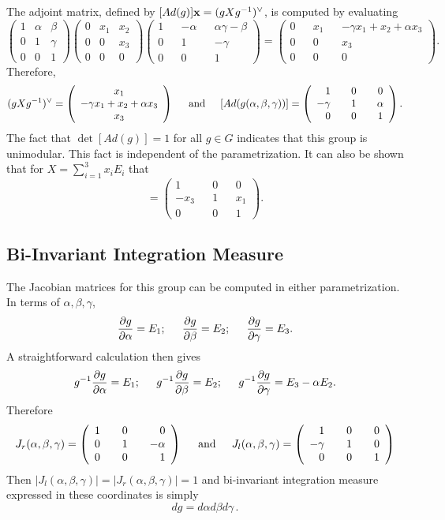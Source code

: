 \documentclass{svmult}
\def\htab{ {\hskip 0.1 true in} }
\newcommand{\ba}{\left(\begin{array}}
\newcommand{\ea}{\end{array}\right)}
\newcommand{\beq}{ \begin{equation}}
\newcommand{\eeq}{ \end{equation} }
\newcommand{\askip}{\htab\htab {\rm and} \htab\htab}
\begin{document}
The adjoint matrix, defined by $[Ad(g)] {\bf x} = (g X g^{-1})^{\vee}$,
is computed by evaluating
$$ \ba{ccc}
1 & \alpha & \beta \\
0 & 1 & \gamma \\
0 & 0 & 1
\ea \ba{ccc}
0 & x_1 & x_2 \\
0 & 0 & x_3 \\
0 & 0 & 0
\ea \ba{ccccc}
1 & & -\alpha & & \alpha \gamma -\beta \\
0 & & 1 & &  -\gamma \\
0 & & 0 & & 1
\ea = \ba{ccccc}
0 & & x_1 & & -\gamma x_1 + x_2 + \alpha x_3 \\
0 & & 0 & & x_3 \\
0 & & 0 & & 0
\ea . $$
Therefore,
$$ (g X g^{-1})^{\vee} = \ba{c}
x_1 \\
-\gamma x_1 + x_2 + \alpha x_3 \\
x_3 \ea \askip
[Ad(g(\alpha, \beta, \gamma))] =
\ba{rcccc}
1 & &   0 & &   0 \\
-\gamma & &   1 & &    \alpha\\
0 & &   0 & &   1
\ea .$$
The fact that $\det [Ad(g)] = 1$ for all $g \in G$ indicates that this
group is unimodular. This fact is independent of the parametrization.
It can also be shown that for $X = \sum_{i=1}^{3} x_i E_i$ that
\beq [Ad(\exp X)] =  \ba{ccccc}
1 & &   0 & &   0 \\
-x_3 & &   1 & &   x_1 \\
0 & &   0 & &   1
\ea.
\label{h3adeq33rr}
\eeq

\subsection{Bi-Invariant Integration Measure}

The Jacobian matrices for this group can be computed in either parametrization.
In terms of $\alpha, \beta, \gamma$,
$$ \frac{\partial g}{\partial \alpha} = E_1 ;\htab\htab
\frac{\partial g}{\partial \beta} = E_2 ;\htab\htab
\frac{\partial g}{\partial \gamma} = E_3 . $$
A straightforward calculation then gives
$$ g^{-1} \frac{\partial g}{\partial \alpha} = E_1; \htab\htab
g^{-1} \frac{\partial g}{\partial \beta} = E_2; \htab\htab
g^{-1} \frac{\partial g}{\partial \gamma} = E_3 - \alpha E_2. $$
Therefore
\beq
J_r(\alpha, \beta, \gamma) = \ba{ccccr}
1 & & 0 & & 0 \\
0 & & 1 & & -\alpha \\
0 & & 0 & & 1
\ea \htab\htab {\rm and} \htab\htab
J_l(\alpha, \beta, \gamma) = \ba{rcccc}
1 & & 0 & & 0 \\
-\gamma & &  1 & &  0 \\
0 & &  0 & &  1
\ea
\eeq
Then $|J_l(\alpha, \beta, \gamma)| = |J_r(\alpha, \beta, \gamma)| = 1$ and bi-invariant integration measure expressed in these coordinates is simply
$$ dg = d\alpha d\beta d\gamma \,. $$
\end{document}
